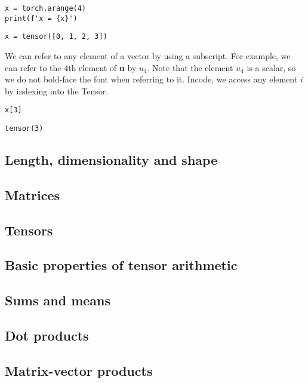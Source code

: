 \documentclass[]{article}
\begin{document}
\begin{verbatim}
x = torch.arange(4)
print(f'x = {x}')
\end{verbatim}

\begin{verbatim}
x = tensor([0, 1, 2, 3])
\end{verbatim}

We can refer to any element of a vector by using a subscript. For example, we can refer to the 4th element of \textbf{u} by $ u_4 $. Note that the element $ u_4 $ is a scalar, so we do not bold-face the font when referring to it. Incode, we access any element $ i $ by indexing into the Tensor.

\begin{verbatim}
x[3]
\end{verbatim}

\begin{verbatim}
tensor(3)
\end{verbatim}

\subsection{Length, dimensionality and shape}

\subsection{Matrices}

\subsection{Tensors}

\subsection{Basic properties of tensor arithmetic}

\subsection{Sums and means}

\subsection{Dot products}

\subsection{Matrix-vector products}
\end{document}
